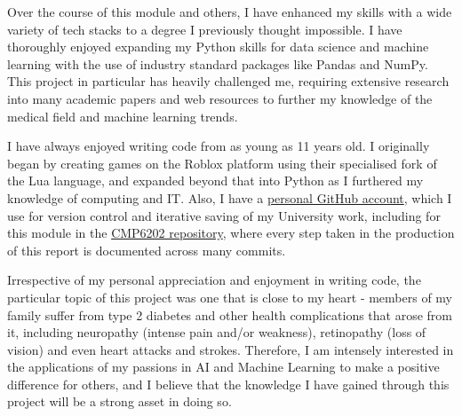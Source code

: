 \documentclass[12pt]{report}
\newcommand{\para}{\vspace{8pt}\noindent}
\begin{document}
Over the course of this module and others, I have enhanced my skills with a wide variety of tech stacks to a degree 
I previously thought impossible. I have thoroughly enjoyed expanding my Python skills for data science and machine learning 
with the use of industry standard packages like Pandas and NumPy. This project in particular has heavily challenged me, 
requiring extensive research into many academic papers and web resources to further my knowledge of the medical field 
and machine learning trends.

\para I have always enjoyed writing code from as young as 11 years old. I originally began by creating games on the Roblox platform 
using their specialised fork of the Lua language, and expanded beyond that into Python as I furthered my knowledge of computing 
and IT. Also, I have a \href{https://github.com/LewGoesB00M}{personal GitHub account}, which I use for version control and iterative 
saving of my University work, including for this module in the \href{https://github.com/LewGoesB00M/CMP6202}{CMP6202 repository}, 
where every step taken in the production of this report is documented across many commits.

\para Irrespective of my personal appreciation and enjoyment in writing code, the particular topic of this project was one 
that is close to my heart - members of my family suffer from type 2 diabetes and other health complications that arose from it,
including neuropathy (intense pain and/or weakness), retinopathy (loss of vision) and even heart attacks and strokes. 
Therefore, I am intensely interested in the applications of my passions in AI and Machine Learning to make a positive difference 
for others, and I believe that the knowledge I have gained through this project will be a strong asset in doing so.





\printbibliography
\end{document}
